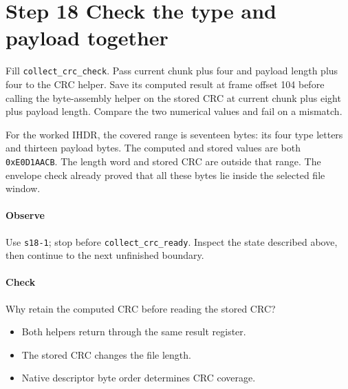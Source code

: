 \section{Step 18 Check the type and payload together}\label{png-collect-s18}
Fill \texttt{collect\_crc\_check}. Pass current chunk plus four and payload length plus four to the CRC helper. Save its computed result at frame offset 104 before calling the byte-assembly helper on the stored CRC at current chunk plus eight plus payload length. Compare the two numerical values and fail on a mismatch.

For the worked IHDR, the covered range is seventeen bytes: its four type letters and thirteen payload bytes. The computed and stored values are both \texttt{0xE0D1AACB}. The length word and stored CRC are outside that range. The envelope check already proved that all these bytes lie inside the selected file window.

\paragraph{Observe} Use \texttt{s18-1}; stop before \texttt{collect\_crc\_ready}. Inspect the state described above, then continue to the next unfinished boundary.

\paragraph{Check} Why retain the computed CRC before reading the stored CRC?
\begin{itemize}
\item[A.] Both helpers return through the same result register.
\item[B.] The stored CRC changes the file length.
\item[C.] Native descriptor byte order determines CRC coverage.
\end{itemize}
